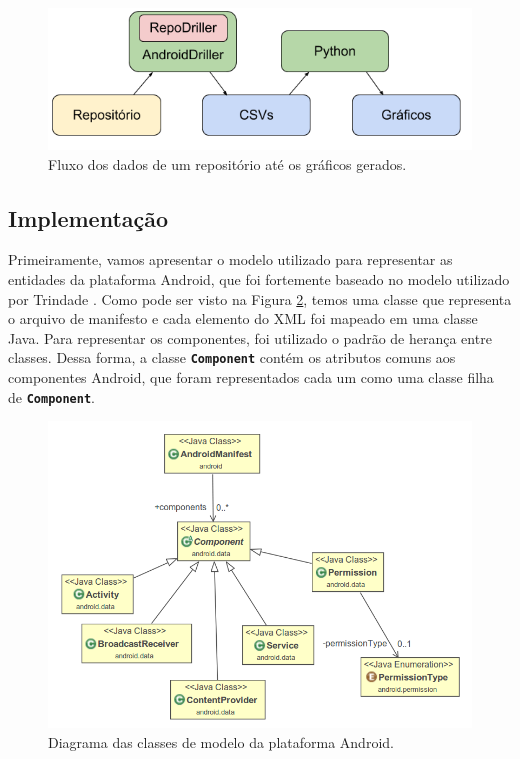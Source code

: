 \documentclass[a4paper,12pt]{article}
\begin{document}
 \begin{figure}[h]
 \centering
 \includegraphics[width=0.65\linewidth]{imgs/workflow.png}
 \caption{Fluxo dos dados de um repositório até os gráficos gerados.}
 \label{fig:workflow}
 \end{figure}



\subsection{Implementação}%
\label{sec:implementacao}


Primeiramente, vamos apresentar o modelo utilizado para representar as entidades da plataforma Android, que foi fortemente baseado no modelo utilizado por Trindade \cite{jptt}. Como pode ser visto na Figura \ref{fig:model}, temos uma classe que representa o arquivo de manifesto e cada elemento do XML foi mapeado em uma classe Java. Para representar os componentes, foi utilizado o padrão de herança entre classes. Dessa forma, a classe {\small\texttt{\textbf{Component}}} contém os atributos comuns aos componentes Android, que foram representados cada um como uma classe filha de {\small\texttt{\textbf{Component}}}.\\

\begin{figure}[H]
\centering
\includegraphics[width=0.8\linewidth]{imgs/model.png}
\caption{Diagrama das classes de modelo da plataforma Android.}
\label{fig:model}
\end{figure}
\end{document}

